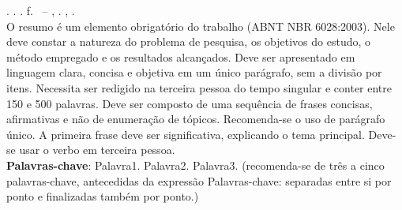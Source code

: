 \begin{resumo}[RESUMO]
\begin{SingleSpacing}

\imprimircitacaoautor. \MakeUppercase{\textbf{\imprimirtitulo}}. \textnormal{\imprimirdata. \pageref {LastPage} f. \imprimirprojeto\ – \imprimircurso, \imprimirinstituicao. \imprimirlocal, \imprimirdata}.\\

O resumo é um elemento obrigatório do trabalho (ABNT NBR 6028:2003). Nele deve constar
a natureza do problema de pesquisa, os objetivos do estudo, o método empregado e os
resultados alcançados. Deve ser apresentado em linguagem clara, concisa e objetiva em um
único parágrafo, sem a divisão por itens. Necessita ser redigido na terceira pessoa do tempo
singular e conter entre 150 e 500 palavras. Deve ser composto de uma sequência de frases
concisas, afirmativas e não de enumeração de tópicos. Recomenda-se o uso de parágrafo
único. A primeira frase deve ser significativa, explicando o tema principal. Deve-se usar o
verbo em terceira pessoa.\\

\textbf{Palavras-chave}: Palavra1. Palavra2. Palavra3. (recomenda-se de três a cinco palavras-chave,
antecedidas da expressão Palavras-chave: separadas entre si por ponto e finalizadas também
por ponto.)
\end{SingleSpacing}
\end{resumo}